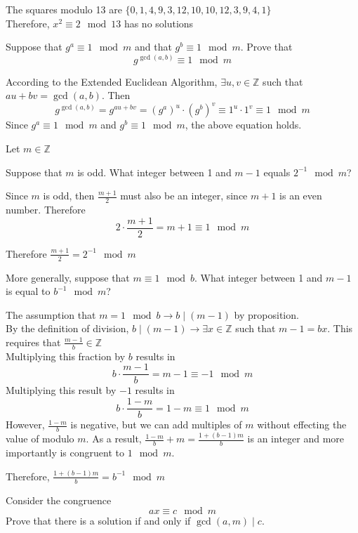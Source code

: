 \documentclass[12pt]{article}
\begin{document}
    \solution
    The squares modulo 13 are $\{0,1,4,9,3,12,10,10,12,3,9,4,1\}$\\
    Therefore, $x^2\equiv 2\mod 13$ has no solutions

    \problem Suppose that $g^a\equiv 1\mod m$ and that $g^b\equiv 1\mod m$. Prove that
    \[g^{\gcd(a,b)}\equiv 1\mod m\]

    \solution
    According to the Extended Euclidean Algorithm, $\exists u,v\in\mathbb{Z}$ such that $au+bv=\gcd(a,b)$. Then
    \[g^{\gcd(a,b)}=g^{au+bv}=(g^a)^u\cdot(g^b)^v\equiv1^u\cdot1^v\equiv 1\mod{m}\]
    Since $g^a\equiv1\mod{m}$ and $g^b\equiv1\mod{m}$, the above equation holds.

    \newpage
    \problem Let $m\in\mathbb{Z}$
    
    \subproblem Suppose that $m$ is odd. What integer between 1 and $m-1$ equals $2^{-1}\mod{m}$?

    \solution
    Since $m$ is odd, then $\frac{m+1}{2}$ must also be an integer, since $m+1$ is an even number. Therefore
    \[2\cdot\frac{m+1}{2}=m+1\equiv1\mod{m}\]

    \noindent
    Therefore $\frac{m+1}{2}=2^{-1}\mod{m}$
    
    \subproblem More generally, suppose that $m\equiv 1\mod b$. What integer between 1 and $m-1$ is equal to $b^{-1}\mod m$?

    \solution
    The assumption that $m=1\mod{b}\rightarrow b\mid (m-1)$ by proposition.\\
    By the definition of division, $b\mid (m-1)\rightarrow\exists x\in\mathbb{Z}$ such that $m-1=bx$. This requires that $\frac{m-1}{b}\in\mathbb{Z}$\\
    Multiplying this fraction by $b$ results in
    \[b\cdot\frac{m-1}{b}=m-1\equiv-1\mod{m}\]
    Multiplying this result by $-1$ results in
    \[b\cdot\frac{1-m}{b}=1-m\equiv1\mod{m}\]
    However, $\frac{1-m}{b}$ is negative, but we can add multiples of $m$ without effecting the value of modulo $m$. As a result, $\frac{1-m}{b}+m=\frac{1+(b-1)m}{b}$ is an integer and more importantly is congruent to $1\mod{m}$.

    \noindent
    Therefore, $\frac{1+(b-1)m}{b}=b^{-1}\mod{m}$

    \newpage
    \problem Consider the congruence
    \[
    ax\equiv c\mod m
    \]
    Prove that there is a solution if and only if $\gcd(a,m)\mid c$.
\end{document}
